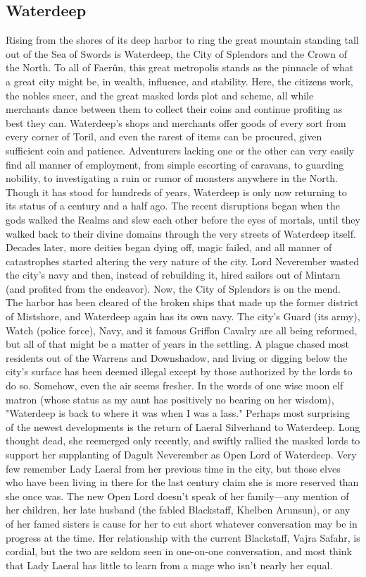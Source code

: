 \documentclass[10pt,a4paper,twoside,twocolumn,openany,bg=print,nodeprecatedcode]{dndbook}
\begin{document}
\subsection{Waterdeep}
Rising from the shores of its deep harbor to ring the great mountain standing tall out of the Sea of Swords is Waterdeep, the City of Splendors and the Crown of the North. To all of Faerûn, this great metropolis stands as the pinnacle of what a great city might be, in wealth, influence, and stability. Here, the citizens work, the nobles sneer, and the great masked lords plot and scheme, all while merchants dance between them to collect their coins and continue profiting as best they can. Waterdeep's shops and merchants offer goods of every sort from every corner of Toril, and even the rarest of items can be procured, given sufficient coin and patience. Adventurers lacking one or the other can very easily find all manner of employment, from simple escorting of caravans, to guarding nobility, to investigating a ruin or rumor of monsters anywhere in the North.
Though it has stood for hundreds of years, Waterdeep is only now returning to its status of a century and a half ago. The recent disruptions began when the gods walked the Realms and slew each other before the eyes of mortals, until they walked back to their divine domains through the very streets of Waterdeep itself. Decades later, more deities began dying off, magic failed, and all manner of catastrophes started altering the very nature of the city. Lord Neverember wasted the city's navy and then, instead of rebuilding it, hired sailors out of Mintarn (and profited from the endeavor).
Now, the City of Splendors is on the mend. The harbor has been cleared of the broken ships that made up the former district of Mistshore, and Waterdeep again has its own navy. The city's Guard (its army), Watch (police force), Navy, and it famous Griffon Cavalry are all being reformed, but all of that might be a matter of years in the settling. A plague chased most residents out of the Warrens and Downshadow, and living or digging below the city's surface has been deemed illegal except by those authorized by the lords to do so. Somehow, even the air seems fresher. In the words of one wise moon elf matron (whose status as my aunt has positively no bearing on her wisdom), "Waterdeep is back to where it was when I was a lass."
Perhaps most surprising of the newest developments is the return of Laeral Silverhand to Waterdeep. Long thought dead, she reemerged only recently, and swiftly rallied the masked lords to support her supplanting of Dagult Neverember as Open Lord of Waterdeep. Very few remember Lady Laeral from her previous time in the city, but those elves who have been living in there for the last century claim she is more reserved than she once was. The new Open Lord doesn't speak of her family—any mention of her children, her late husband (the fabled Blackstaff, Khelben Arunsun), or any of her famed sisters is cause for her to cut short whatever conversation may be in progress at the time. Her relationship with the current Blackstaff, Vajra Safahr, is cordial, but the two are seldom seen in one-on-one conversation, and most think that Lady Laeral has little to learn from a mage who isn't nearly her equal.
\end{document}
